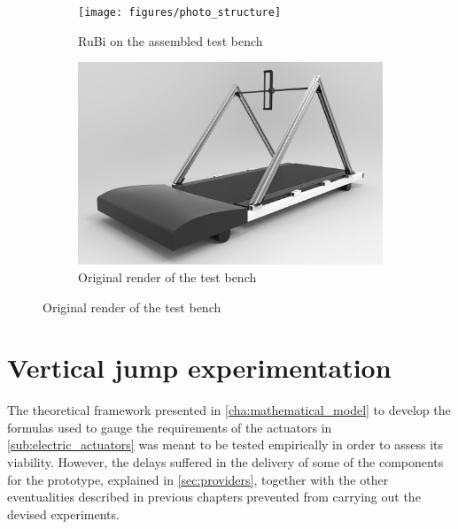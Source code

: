 \begin{figure}[ht!]
    \centering
    \begin{subfigure}[b]{0.49\textwidth}
        \texttt{[image: figures/photo\_structure]}
        \caption{RuBi on the assembled test bench}
        \label{fig:photo_structure}
    \end{subfigure}
    \begin{subfigure}[b]{0.49\textwidth}
        \includegraphics[width=\textwidth]{figures/legs_structure}
        \caption{Original render of the test bench}
        \label{fig:legs_structure}
    \end{subfigure}
\end{figure}  



\section{Vertical jump experimentation} %
\label{sec:vertical_jump_experimentation}
The theoretical framework presented in \ref{cha:mathematical_model} to develop the formulas used to gauge the requirements of the actuators in \ref{sub:electric_actuators} was meant to be tested empirically in order to assess its viability.
However, the delays suffered in the delivery of some of the components for the prototype, explained in \ref{sec:providers},
together with the other eventualities described in previous chapters prevented from carrying out the devised experiments.

